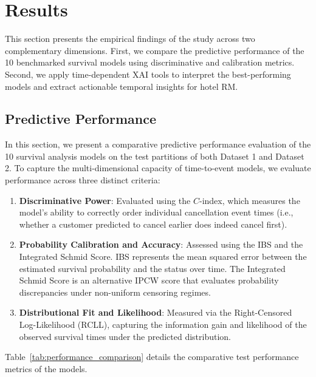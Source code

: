 \documentclass[pdflatex,sn-mathphys-ay]{sn-jnl}
\theoremstyle{thmstyleone}%
\theoremstyle{thmstyletwo}%
\theoremstyle{thmstylethree}%
\begin{document}
\section{Results}
\label{sec:results}

This section presents the empirical findings of the study across two complementary dimensions. First, we compare the predictive performance of the 10 benchmarked survival models using discriminative and calibration metrics. Second, we apply time-dependent XAI tools to interpret the best-performing models and extract actionable temporal insights for hotel RM.

\subsection{Predictive Performance}

In this section, we present a comparative predictive performance evaluation of the 10 survival analysis models on the test partitions of both Dataset 1 and Dataset 2. To capture the multi-dimensional capacity of time-to-event models, we evaluate performance across three distinct criteria:
\begin{enumerate}
\item \textbf{Discriminative Power}: Evaluated using the $C$-index, which measures the model's ability to correctly order individual cancellation event times (i.e., whether a customer predicted to cancel earlier does indeed cancel first).
\item \textbf{Probability Calibration and Accuracy}: Assessed using the IBS and the Integrated Schmid Score. IBS represents the mean squared error between the estimated survival probability and the status over time. The Integrated Schmid Score is an alternative IPCW score that evaluates probability discrepancies under non-uniform censoring regimes.
\item \textbf{Distributional Fit and Likelihood}: Measured via the Right-Censored Log-Likelihood (RCLL), capturing the information gain and likelihood of the observed survival times under the predicted distribution.
\end{enumerate}

Table~\ref{tab:performance_comparison} details the comparative test performance metrics of the models.
\end{document}
